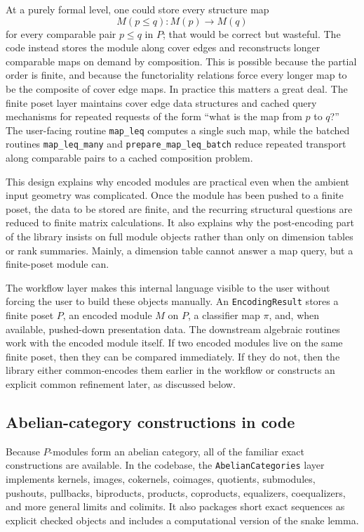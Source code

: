 \documentclass[11pt]{article}
\theoremstyle{definition}
\theoremstyle{remark}
\begin{document}
At a purely formal level, one could store every structure map
\[
M(p\leq q) : M(p)\to M(q)
\]
for every comparable pair $p \leq q$ in $P$; that would be correct but wasteful.  The code instead stores the module along cover edges and reconstructs longer comparable maps on demand by composition.  This is possible because the partial order is finite, and because the functoriality relations force every longer map to be the composite of cover edge maps.  In practice this matters a great deal.  The finite poset layer maintains cover edge data structures and cached query mechanisms for repeated requests of the form ``what is the map from $p$ to $q$?''  The user-facing routine \texttt{map\_leq} computes a single such map, while the batched routines \texttt{map\_leq\_many} and \texttt{prepare\_map\_leq\_batch} reduce repeated transport along comparable pairs to a cached composition problem.

This design explains why encoded modules are practical even when the ambient input geometry was complicated.  Once the module has been pushed to a finite poset, the data to be stored are finite, and the recurring structural questions are reduced to finite matrix calculations.  It also explains why the post-encoding part of the library insists on full module objects rather than only on dimension tables or rank summaries. Mainly, a dimension table cannot answer a map query, but a finite-poset module can.

The workflow layer makes this internal language visible to the user without forcing the user to build these objects manually.  An \texttt{EncodingResult} stores a finite poset $P$, an encoded module $M$ on $P$, a classifier map $\pi$, and, when available, pushed-down presentation data.  The downstream algebraic routines work with the encoded module itself.  If two encoded modules live on the same finite poset, then they can be compared immediately.  If they do not, then the library either common-encodes them earlier in the workflow or constructs an explicit common refinement later, as discussed below.

\subsection{Abelian-category constructions in code}

Because $P$-modules form an abelian category, all of the familiar exact constructions are available. In the codebase, the \texttt{AbelianCategories} layer implements kernels, images, cokernels, coimages, quotients, submodules, pushouts, pullbacks, biproducts, products, coproducts, equalizers, coequalizers, and more general limits and colimits.  It also packages short exact sequences as explicit checked objects and includes a computational version of the snake lemma.
\end{document}
